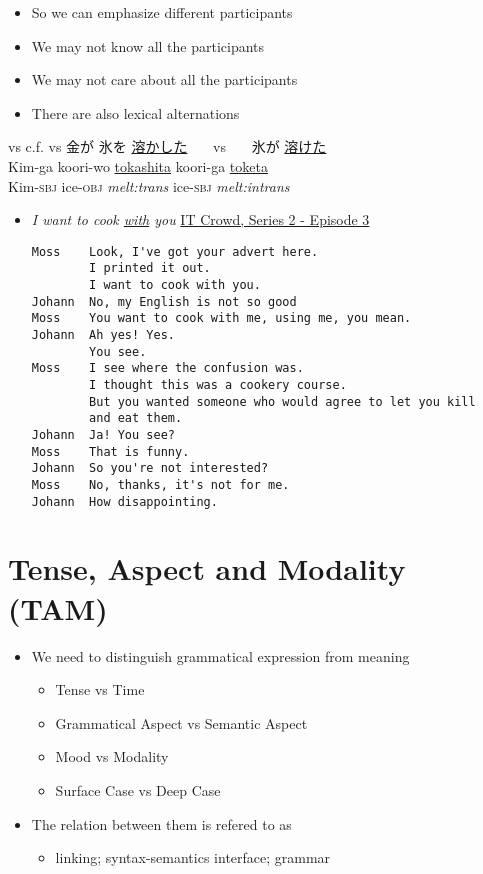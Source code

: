 \documentclass[a4paper,landscape,headrule,footrule,xetex]{foils}
\begin{document}
\begin{itemize}
\item So we can emphasize different participants
\item We may not know all the participants
\item We may not care about all the participants
\item There are also lexical alternations
\end{itemize}
\begin{exe}
\ex {} vs 
\ex c.f.  vs 
\ex \glll 金が 氷を \ul{溶かした}  {~~~vs~~~}  氷が \ul{溶けた} \\ 
Kim-ga koori-wo \ul{tokashita}  {} koori-ga \ul{toketa} \\
  Kim-\textsc{sbj} ice-\textsc{obj} \textit{melt:trans} 
{} ice-\textsc{sbj} \textit{melt:intrans} \\
\end{exe}



\begin{itemize}
\item \textit{I want to cook \ul{with} you}  \href{https://www.youtube.com/watch?v=gOE-q20RcDM}{IT Crowd, Series 2 - Episode 3}
\begin{verbatim}
Moss    Look, I've got your advert here.
        I printed it out.
        I want to cook with you.
Johann  No, my English is not so good 
Moss    You want to cook with me, using me, you mean.
Johann  Ah yes! Yes.
        You see.
Moss    I see where the confusion was.
        I thought this was a cookery course.
        But you wanted someone who would agree to let you kill
        and eat them.
Johann  Ja! You see? 
Moss    That is funny.
Johann  So you're not interested? 
Moss    No, thanks, it's not for me.
Johann  How disappointing.
\end{verbatim}
\end{itemize}


\section{Tense, Aspect and Modality (TAM)}

\begin{itemize}
\item  We need to distinguish grammatical expression from 
  meaning
  \begin{itemize}
  \item  Tense vs Time
  \item  Grammatical Aspect vs Semantic Aspect
  \item  Mood vs Modality
  \item  Surface Case vs Deep Case
  \end{itemize}
\item  The relation between them is refered to as
  \begin{itemize}
  \item  linking; syntax-semantics interface; grammar
  \end{itemize}
\end{itemize} 
 
\end{document}
